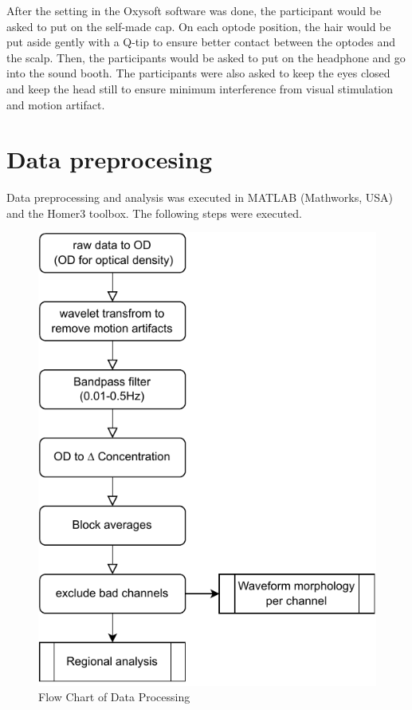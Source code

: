 After the setting in the Oxysoft software was done, the participant would be asked to put on the self-made cap. On each optode position, the hair would be put aside gently with a Q-tip to ensure better contact between the optodes and the scalp. Then, the participants would be asked to put on the headphone and go into the sound booth. The participants were also asked to keep the eyes closed and keep the head still to ensure minimum interference from visual stimulation and motion artifact.


\section {Data preprocesing}
Data preprocessing and analysis was executed in MATLAB (Mathworks, USA) and the Homer3 toolbox. The following steps were executed.

\begin{figure}[H]
  \centering
    \includegraphics[scale=.9]{pdf/flowchart2.pdf}
  \caption{Flow Chart of Data Processing}
  \label{fig:somesignal}
\end{figure}


